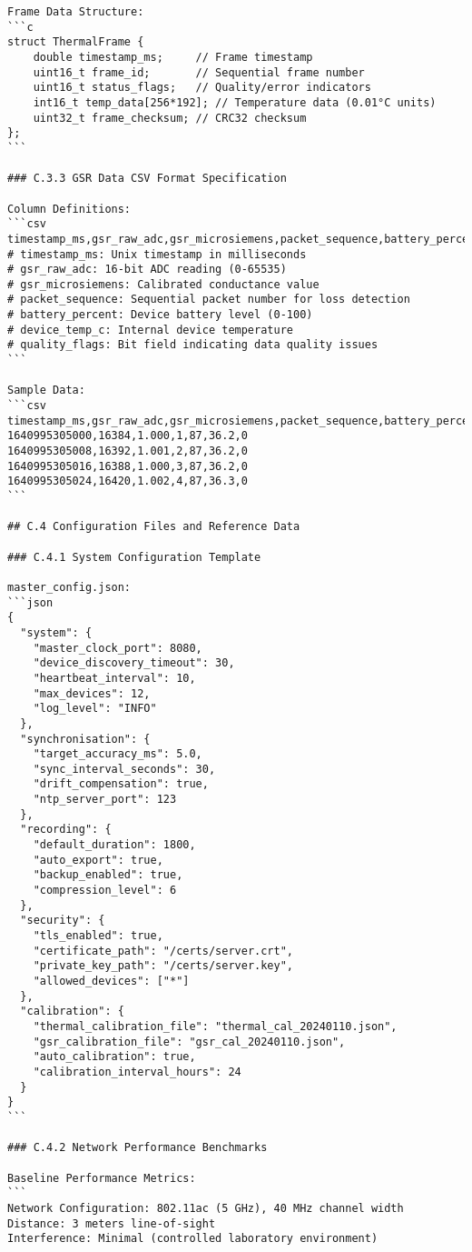 \begin{verbatim}
Frame Data Structure:
```c
struct ThermalFrame {
    double timestamp_ms;     // Frame timestamp
    uint16_t frame_id;       // Sequential frame number
    uint16_t status_flags;   // Quality/error indicators
    int16_t temp_data[256*192]; // Temperature data (0.01°C units)
    uint32_t frame_checksum; // CRC32 checksum
};
```

### C.3.3 GSR Data CSV Format Specification

Column Definitions:
```csv
timestamp_ms,gsr_raw_adc,gsr_microsiemens,packet_sequence,battery_percent,device_temp_c,quality_flags
# timestamp_ms: Unix timestamp in milliseconds
# gsr_raw_adc: 16-bit ADC reading (0-65535)
# gsr_microsiemens: Calibrated conductance value
# packet_sequence: Sequential packet number for loss detection
# battery_percent: Device battery level (0-100)
# device_temp_c: Internal device temperature
# quality_flags: Bit field indicating data quality issues
```

Sample Data:
```csv
timestamp_ms,gsr_raw_adc,gsr_microsiemens,packet_sequence,battery_percent,device_temp_c,quality_flags
1640995305000,16384,1.000,1,87,36.2,0
1640995305008,16392,1.001,2,87,36.2,0
1640995305016,16388,1.000,3,87,36.2,0
1640995305024,16420,1.002,4,87,36.3,0
```

## C.4 Configuration Files and Reference Data

### C.4.1 System Configuration Template

master_config.json:
```json
{
  "system": {
    "master_clock_port": 8080,
    "device_discovery_timeout": 30,
    "heartbeat_interval": 10,
    "max_devices": 12,
    "log_level": "INFO"
  },
  "synchronisation": {
    "target_accuracy_ms": 5.0,
    "sync_interval_seconds": 30,
    "drift_compensation": true,
    "ntp_server_port": 123
  },
  "recording": {
    "default_duration": 1800,
    "auto_export": true,
    "backup_enabled": true,
    "compression_level": 6
  },
  "security": {
    "tls_enabled": true,
    "certificate_path": "/certs/server.crt",
    "private_key_path": "/certs/server.key",
    "allowed_devices": ["*"]
  },
  "calibration": {
    "thermal_calibration_file": "thermal_cal_20240110.json",
    "gsr_calibration_file": "gsr_cal_20240110.json",
    "auto_calibration": true,
    "calibration_interval_hours": 24
  }
}
```

### C.4.2 Network Performance Benchmarks

Baseline Performance Metrics:
```
Network Configuration: 802.11ac (5 GHz), 40 MHz channel width
Distance: 3 meters line-of-sight
Interference: Minimal (controlled laboratory environment)


\end{verbatim}
